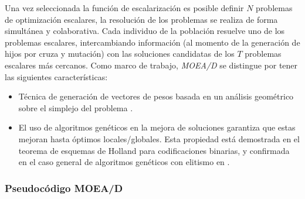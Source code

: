 Una vez seleccionada la función de escalarización es posible definir $N$ problemas de optimización escalares, la resolución de los problemas se realiza de forma simultánea
y colaborativa. Cada individuo de la población resuelve uno de los problemas escalares, intercambiando información (al momento de la generación de hijos por cruza y mutación) con las soluciones candidatas de los $T$ problemas escalares más cercanos.
Como marco de trabajo, \emph{MOEA/D} se distingue por tener las siguientes características:

 \begin{itemize}
 \item Técnica de generación de vectores de pesos basada en un análisis geométrico sobre el simplejo del problema \cite{mie99,Das:1998:NIN:588907.589322, Messac2003}.
 \item El uso de algoritmos genéticos en la mejora de soluciones garantiza que estas mejoran hasta óptimos locales/globales. Esta propiedad está demostrada en el teorema de esquemas de Holland \cite{Holland:1992:ANA:531075} para codificaciones binarias, y confirmada en el caso general de algoritmos genéticos con elitismo en \cite{rudolph1994convergence}.
 \end{itemize}


\subsubsection{Pseudocódigo MOEA/D}


